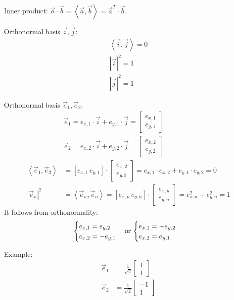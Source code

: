 \documentclass{article}
\begin{document}
Inner product: $ \vec{a} \cdot \vec{b} = \left< \vec{a}, \vec{b} \right> = \vec{a}^T \cdot \vec{b}$.

Orthonormal basis $\vec{i}, \vec{j}$:
\begin{align*}
\left< \vec{i}, \vec{j} \right> = 0 \\
\left|\vec{i}\right|^2 = 1 \\
\left|\vec{j}\right|^2 = 1
\end{align*}

Orthonormal basis $\vec{e}_1,  \vec{e}_2$:
\begin{align*}
&\vec{e}_1 = e_{x,1} \cdot \vec{i} + e_{y,1} \cdot \vec{j} =   \begin{bmatrix}  e_{x,1} \\ e_{y,1}\end{bmatrix} \\
&\vec{e}_2 = e_{x,2} \cdot \vec{i} + e_{y,2} \cdot \vec{j} =   \begin{bmatrix}  e_{x,2} \\ e_{y,2}\end{bmatrix} \\
\left< \vec{e}_1,  \vec{e}_2 \right>  &= \left[  e_{x,1} \,  e_{y,1} \right] \cdot  \begin{bmatrix}  e_{x,2} \\ e_{y,2}\end{bmatrix} = 
e_{x,1} \cdot e_{x,2} + e_{y,1} \cdot e_{y,2} = 0  \\
\left| \vec{e}_n \right| ^2 &= \left< \vec{e}_n,  \vec{e}_n \right> = \left[  e_{x,n} \,  e_{y,n} \right] \cdot  \begin{bmatrix}  e_{x,n} \\ e_{y,n}\end{bmatrix} = 
e_{x,n}^2 + e_{y,n}^2 = 1
\end{align*}
It follows from orthonormality:
\begin{align} \label{eq:orthonormal}
    \begin{cases}
        e_{x,1} = e_{y,2} \\
        e_{x,2} = -e_{y,1}
    \end{cases} \textnormal{or} \,
    \begin{cases}
        e_{x,1} = -e_{y,2} \\
        e_{x,2} = e_{y,1}
    \end{cases}
\end{align}


Example:
\begin{align*}
    \vec{e}_1 &= \frac{1}{\sqrt{2}}  \begin{bmatrix} 1 \\ 1\end{bmatrix} \\
    \vec{e}_2 &= \frac{1}{\sqrt{2}} \begin{bmatrix}  -1 \\ 1\end{bmatrix}
\end{align*}
\end{document}
